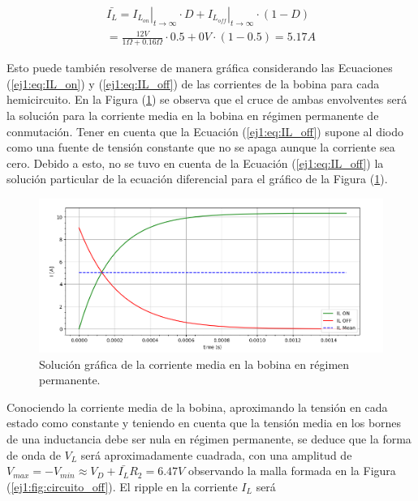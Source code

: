 \begin{equation}
\begin{gathered}
	\bar{I_L} = \left. I_{L_{on}}\right|_{t \rightarrow \infty} \cdot D + \left. I_{L_{off}}\right|_{t \rightarrow \infty} \cdot (1-D) \\ = \frac{12V}{1\Omega + 0.16\Omega} \cdot 0.5 + 0V \cdot (1-0.5) = 5.17A
\end{gathered}
\label{ej1:eq:ilbar}
\end{equation}

Esto puede también resolverse de manera gráfica considerando las Ecuaciones (\ref{ej1:eq:IL_on}) y (\ref{ej1:eq:IL_off}) de las corrientes de la bobina para cada hemicircuito. En la Figura (\ref{ej1:fig:ILmediagrafico}) se observa que el cruce de ambas envolventes será la solución para la corriente media en la bobina en régimen permanente de conmutación. Tener en cuenta que la Ecuación (\ref{ej1:eq:IL_off}) supone al diodo como una fuente de tensión constante que no se apaga aunque la corriente sea cero. Debido a esto, no se tuvo en cuenta de la Ecuación (\ref{ej1:eq:IL_off}) la solución particular de la ecuación diferencial para el gráfico de la Figura (\ref{ej1:fig:ILmediagrafico}).

\begin{figure}[H]
	\centering
	\includegraphics[width=0.9\linewidth]{ImagenesEjercicio-1/solgraficaIL}
	\caption{Solución gráfica de la corriente media en la bobina en régimen permanente.}
	\label{ej1:fig:ILmediagrafico}
\end{figure}

Conociendo la corriente media de la bobina, aproximando la tensión en cada estado como constante y teniendo en cuenta que la tensión media en los bornes de una inductancia debe ser nula en régimen permanente, se deduce que la forma de onda de $V_L$ será aproximadamente cuadrada, con una amplitud de $V_{max} = -V_{min} \approx V_D + \bar{I_L}R_2 = 6.47V$ observando la malla formada en la Figura (\ref{ej1:fig:circuito_off}). El ripple en la corriente $I_L$ será 

